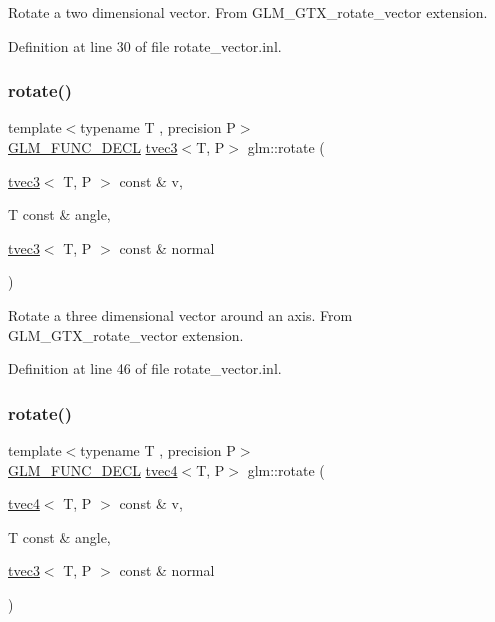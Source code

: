 Rotate a two dimensional vector. From G\+L\+M\+\_\+\+G\+T\+X\+\_\+rotate\+\_\+vector extension. 

Definition at line 30 of file rotate\+\_\+vector.\+inl.

\mbox{\label{group__gtx__rotate__vector_ga526b6f8995bc0946aa1a04e9297de7c6}} 
\subsubsection{\texorpdfstring{rotate()}{rotate()}\hspace{0.1cm}{\footnotesize\ttfamily [2/3]}}
{\footnotesize\ttfamily template$<$typename T , precision P$>$ \\
\mbox{\hyperlink{setup_8hpp_ab2d052de21a70539923e9bcbf6e83a51}{G\+L\+M\+\_\+\+F\+U\+N\+C\+\_\+\+D\+E\+CL}} \mbox{\hyperlink{structglm_1_1tvec3}{tvec3}}$<$T, P$>$ glm\+::rotate (\begin{DoxyParamCaption}\item[{\mbox{\hyperlink{structglm_1_1tvec3}{tvec3}}$<$ T, P $>$ const \&}]{v,  }\item[{T const \&}]{angle,  }\item[{\mbox{\hyperlink{structglm_1_1tvec3}{tvec3}}$<$ T, P $>$ const \&}]{normal }\end{DoxyParamCaption})}

Rotate a three dimensional vector around an axis. From G\+L\+M\+\_\+\+G\+T\+X\+\_\+rotate\+\_\+vector extension. 

Definition at line 46 of file rotate\+\_\+vector.\+inl.

\mbox{\label{group__gtx__rotate__vector_gaf4d59dd2f668f9ffb38048055d1316bd}} 
\subsubsection{\texorpdfstring{rotate()}{rotate()}\hspace{0.1cm}{\footnotesize\ttfamily [3/3]}}
{\footnotesize\ttfamily template$<$typename T , precision P$>$ \\
\mbox{\hyperlink{setup_8hpp_ab2d052de21a70539923e9bcbf6e83a51}{G\+L\+M\+\_\+\+F\+U\+N\+C\+\_\+\+D\+E\+CL}} \mbox{\hyperlink{structglm_1_1tvec4}{tvec4}}$<$T, P$>$ glm\+::rotate (\begin{DoxyParamCaption}\item[{\mbox{\hyperlink{structglm_1_1tvec4}{tvec4}}$<$ T, P $>$ const \&}]{v,  }\item[{T const \&}]{angle,  }\item[{\mbox{\hyperlink{structglm_1_1tvec3}{tvec3}}$<$ T, P $>$ const \&}]{normal }\end{DoxyParamCaption})}

